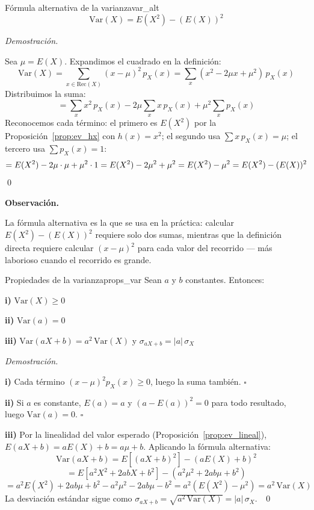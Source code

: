 \documentclass[12pt, a4paper]{book}
\newenvironment{observacion}{%
    \par\medskip\noindent\textbf{\color{azul}Observaci\'{o}n.}\enspace\itshape
}{\par\medskip}
\renewenvironment{proof}{%
    \par\medskip\noindent\textit{Demostraci\'{o}n.}\enspace
}{\qed\par\medskip}
\numberwithin{equation}{chapter}
\begin{document}
\begin{proposicion}{Fórmula alternativa de la varianza}{var_alt}
	\[
	\text{Var}(X) = E(X^2) - (E(X))^2
	\]
\end{proposicion}

\begin{proof}
	Sea $\mu = E(X)$. Expandimos el cuadrado en la definición:
	\[
	\text{Var}(X) 
	= \sum_{x \in \text{Rec}(X)} (x - \mu)^2\, p_X(x)
	= \sum_{x} (x^2 - 2\mu x + \mu^2)\, p_X(x)
	\]
	Distribuimos la suma:
	\[
	= \sum_{x} x^2\, p_X(x) 
	- 2\mu \sum_{x} x\, p_X(x) 
	+ \mu^2 \sum_{x} p_X(x)
	\]
	Reconocemos cada término: el primero es $E(X^2)$ por la 
	Proposición~\ref{prop:ev_hx} con $h(x) = x^2$; el segundo 
	usa $\sum x\, p_X(x) = \mu$; el tercero usa $\sum p_X(x) = 1$:
	\[
	= E(X^2) - 2\mu \cdot \mu + \mu^2 \cdot 1
	= E(X^2) - 2\mu^2 + \mu^2
	= E(X^2) - \mu^2
	= E(X^2) - (E(X))^2 \qedhere
	\]
\end{proof}

\begin{observacion}
	La fórmula alternativa es la que se usa en la práctica: calcular 
	$E(X^2) - (E(X))^2$ requiere solo dos sumas, mientras que la 
	definición directa requiere calcular $(x - \mu)^2$ para cada 
	valor del recorrido — más laborioso cuando el recorrido es grande.
\end{observacion}

\begin{proposicion}{Propiedades de la varianza}{props_var}
	Sean $a$ y $b$ constantes. Entonces:
	
	\medskip
	\noindent\textbf{i)} $\text{Var}(X) \geq 0$
	
	\medskip
	\noindent\textbf{ii)} $\text{Var}(a) = 0$
	
	\medskip
	\noindent\textbf{iii)} $\text{Var}(aX + b) = a^2\,\text{Var}(X)$
	\quad y \quad $\sigma_{aX+b} = |a|\,\sigma_X$
\end{proposicion}

\begin{proof}
	\textbf{i)} Cada término $(x-\mu)^2 p_X(x) \geq 0$, luego 
	la suma también. $\square$
	
	\medskip
	\textbf{ii)} Si $a$ es constante, $E(a) = a$ y 
	$(a - E(a))^2 = 0$ para todo resultado, luego 
	$\text{Var}(a) = 0$. $\square$
	
	\medskip
	\textbf{iii)} Por la linealidad del valor esperado 
	(Proposición~\ref{prop:ev_lineal}), $E(aX+b) = aE(X)+b = 
	a\mu + b$. Aplicando la fórmula alternativa:
	\[
	\text{Var}(aX+b) 
	= E\!\left[(aX+b)^2\right] - (aE(X)+b)^2
	\]
	\[
	= E\!\left[a^2X^2 + 2abX + b^2\right] - 
	(a^2\mu^2 + 2ab\mu + b^2)
	\]
	\[
	= a^2E(X^2) + 2ab\mu + b^2 - a^2\mu^2 - 2ab\mu - b^2
	= a^2\!\left(E(X^2) - \mu^2\right)
	= a^2\,\text{Var}(X)
	\]
	La desviación estándar sigue como 
	$\sigma_{aX+b} = \sqrt{a^2\,\text{Var}(X)} = 
	|a|\,\sigma_X$. $\qedhere$
\end{proof}
\end{document}

